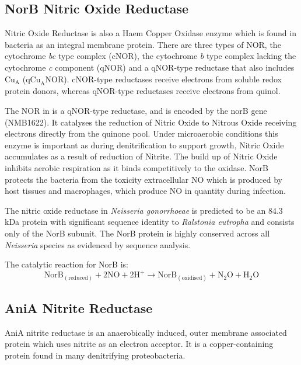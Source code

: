 \subsection{NorB Nitric Oxide Reductase}
Nitric Oxide Reductase is also a Haem Copper Oxidase enzyme which is found in bacteria as an integral membrane protein. There are three types of NOR, the cytochrome \textit{bc} type complex (cNOR), the cytochrome \textit{b} type complex lacking the cytochrome \textit{c} component (qNOR) and a qNOR-type reductase that also includes $\mathrm{Cu}_{\mathrm{A}}$ ($\mathrm{qCu}_{\mathrm{A}}\mathrm{NOR}$). cNOR-type reductases receive electrons from soluble redox protein donors, whereas qNOR-type reductases receive electrons from quinol\cite{Householder2000}.

The NOR in \Nm{} is a qNOR-type reductase\cite{Wasser2002}, and is encoded by the norB gene (NMB1622). It catalyses the reduction of Nitric Oxide to Nitrous Oxide receiving electrons directly from the quinone pool. Under microaerobic conditions this enzyme is important as during denitrification to support growth, Nitric Oxide accumulates as a result of reduction of Nitrite. The build up of Nitric Oxide inhibits aerobic respiration as it binds competitively to the \cbbthree{} oxidase. NorB protects the bacteria from the toxicity extracellular NO which is produced by host tissues and macrophages, which produce NO in quantity during infection\cite{Heurlier2008}.

The nitric oxide reductase in \textit{Neisseria gonorrhoeae} is predicted to be an 84.3 kDa protein with significant sequence identity to \textit{Ralstonia eutropha} and consists only of the NorB subunit\cite{Householder2000}. The NorB protein is highly conserved across all \textit{Neisseria} species as evidenced by sequence analysis\cite{Barth2009}.

The catalytic reaction for NorB is:
\begin{equation}
\mathrm{NorB}_{\mathrm{(reduced)}} + 2\mathrm{NO} + 2\mathrm{H}^+ \rightarrow \mathrm{NorB}_{\mathrm{(oxidised)}} + \mathrm{N}_2\mathrm{O} + \mathrm{H}_2\mathrm{O}
\end{equation}

\subsection{AniA Nitrite Reductase}
AniA nitrite reductase is an anaerobically induced, outer membrane associated protein which uses nitrite as an electron acceptor\cite{Clark1987}. It is a copper-containing protein found in many denitrifying proteobacteria.

